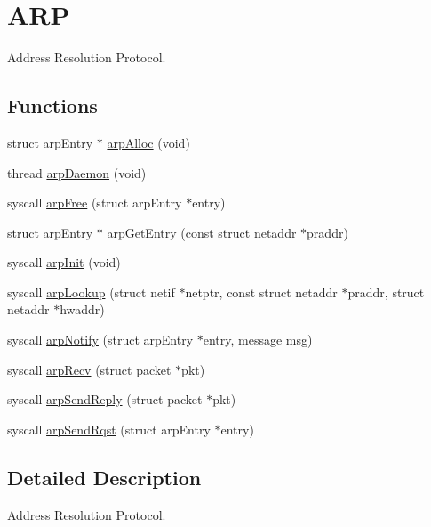 \hypertarget{group__arp}{\section{A\-R\-P}
\label{group__arp}
}


Address Resolution Protocol.  


\subsection*{Functions}
\begin{DoxyCompactItemize}
\item 
struct arp\-Entry $\ast$ \hyperlink{group__arp_gaf964fcba1f7904ca9fa583d4b5b865de}{arp\-Alloc} (void)
\item 
thread \hyperlink{group__arp_ga41ce72f4c1c057a654b684abbf7b0ae6}{arp\-Daemon} (void)
\item 
syscall \hyperlink{group__arp_ga3c49e4cdbd9b2a5fd422357ffb1d6b3f}{arp\-Free} (struct arp\-Entry $\ast$entry)
\item 
struct arp\-Entry $\ast$ \hyperlink{group__arp_ga8a1c1c3f390b623e76a9398efe97290e}{arp\-Get\-Entry} (const struct netaddr $\ast$praddr)
\item 
syscall \hyperlink{group__arp_gae14002a1a9788ef389fd78b071665be8}{arp\-Init} (void)
\item 
syscall \hyperlink{group__arp_ga924e3c0beff4715d8233f6395bd9e9c7}{arp\-Lookup} (struct netif $\ast$netptr, const struct netaddr $\ast$praddr, struct netaddr $\ast$hwaddr)
\item 
syscall \hyperlink{group__arp_gaf5b303c33422acce3bf75135db160681}{arp\-Notify} (struct arp\-Entry $\ast$entry, message msg)
\item 
syscall \hyperlink{group__arp_ga349b8a3b725b48fa8f43ad4dc07ba304}{arp\-Recv} (struct packet $\ast$pkt)
\item 
syscall \hyperlink{group__arp_ga4b01168c2c157b39c98a5483193172b3}{arp\-Send\-Reply} (struct packet $\ast$pkt)
\item 
syscall \hyperlink{group__arp_ga99197c6b2cebadb3372fbd42093cb491}{arp\-Send\-Rqst} (struct arp\-Entry $\ast$entry)
\end{DoxyCompactItemize}


\subsection{Detailed Description}
Address Resolution Protocol. 

